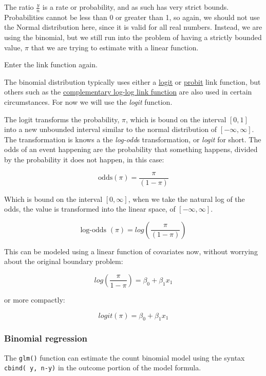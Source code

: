 \documentclass[
  letterpaper,
  DIV=11,
  numbers=noendperiod]{scrreprt}
\begin{document}
The ratio \(\frac{y}{n}\) is a rate or probability, and as such has very
strict bounds. Probabilities cannot be less than 0 or greater than 1, so
again, we should not use the Normal distribution here, since it is valid
for all real numbers. Instead, we are using the binomial, but we still
run into the problem of having a strictly bounded value, \(\pi\) that we
are trying to estimate with a linear function.

Enter the link function again.

The binomial distribution typically uses either a
\href{https://en.wikipedia.org/wiki/Logit}{logit} or
\href{https://en.wikipedia.org/wiki/Probit}{probit} link function, but
others such as the
\href{http://data.princeton.edu/wws509/notes/c3s7.html}{complementary
log-log link function} are also used in certain circumstances. For now
we will use the \emph{logit} function.

The logit transforms the probability, \(\pi\), which is bound on the
interval \([0,1]\) into a new unbounded interval similar to the normal
distribution of \([-\infty, \infty]\). The transformation is knows a the
\emph{log-odd}s transformation, or \emph{logit} for short. The odds of
an event happening are the probability that something happens, divided
by the probability it does not happen, in this case:

\[\text{odds}({\pi}) = \frac{\pi}{(1-\pi)}\]

Which is bound on the interval \([0, \infty]\), when we take the natural
log of the odds, the value is transformed into the linear space, of
\([-\infty, \infty]\).

\[\text{log-odds }({\pi}) = log  \left ( \frac{\pi}{(1-\pi)}  \right) \]

This can be modeled using a linear function of covariates now, without
worrying about the original boundary problem:

\[log  \left ( \frac{\pi}{1-\pi}  \right) = \beta_0 +\beta_1 x_1\]

or more compactly:

\[logit (\pi)  = \beta_0 +\beta_1 x_1\]

\hypertarget{binomial-regression}{%
\subsubsection{Binomial regression}\label{binomial-regression}}

The \texttt{glm()} function can estimate the count binomial model using
the syntax \texttt{cbind(\ y,\ n-y)} in the outcome portion of the model
formula.
\end{document}
